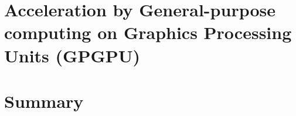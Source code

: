 %
%
%
\section[Acceleration by GPGPU]{Acceleration by General-purpose
computing on Graphics Processing Units (GPGPU)}

%
%
%
\section{Summary}

